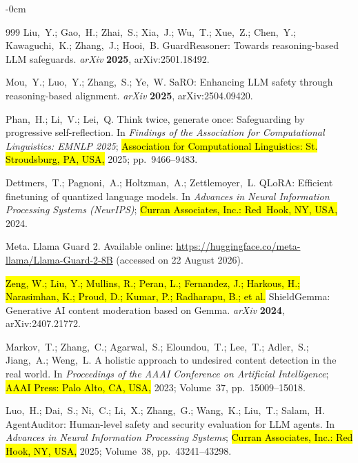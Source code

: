 \documentclass[superintelligence,article,accept,moreauthors]{Definitions/mdpi}
\begin{document}
\begin{adjustwidth}{-\extralength}{0cm}
{\begin{thebibliography}{999}
Liu,~Y.; Gao,~H.; Zhai,~S.; Xia,~J.; Wu,~T.; Xue,~Z.; Chen,~Y.; Kawaguchi,~K.; Zhang,~J.; Hooi,~B.
{GuardReasoner}: Towards reasoning-based {LLM} safeguards.
{\em arXiv} {\bf 2025}, arXiv:2501.18492.

Mou,~Y.; Luo,~Y.; Zhang,~S.; Ye,~W.
{SaRO}: Enhancing {LLM} safety through reasoning-based alignment.
{\em arXiv} {\bf 2025}, arXiv:2504.09420.

Phan,~H.; Li,~V.; Lei,~Q.
Think twice, generate once: Safeguarding by progressive self-reflection.
In {\em Findings of the Association for Computational Linguistics: EMNLP 2025}; \hl{Association for Computational Linguistics: St. Stroudsburg, PA, USA,} 2025; pp.~9466--9483.

Dettmers,~T.; Pagnoni,~A.; Holtzman,~A.; Zettlemoyer,~L.
{QLoRA}: Efficient finetuning of quantized language models.
In {\em Advances in Neural Information Processing Systems (NeurIPS)}; \hl{Curran Associates, Inc.: Red~Hook, NY, USA,} 2024.

Meta. {Llama Guard 2}. Available online: \url{https://huggingface.co/meta-llama/Llama-Guard-2-8B} (accessed on 22 August 2026).



\hl{Zeng, W.; Liu, Y.; Mullins, R.; Peran, L.; Fernandez, J.; Harkous, H.; Narasimhan, K.; Proud, D.; Kumar, P.; Radharapu, B.; et al.} %
{ShieldGemma}: Generative {AI} content moderation based on {Gemma}.
{\em arXiv} {\bf 2024}, arXiv:2407.21772.

Markov,~T.; Zhang,~C.; Agarwal,~S.; Eloundou,~T.; Lee,~T.; Adler,~S.; Jiang,~A.; Weng,~L.
A holistic approach to undesired content detection in the real world.
In {\em Proceedings of the AAAI Conference on Artificial Intelligence}; \hl{AAAI Press: Palo Alto, CA, USA,} 2023; Volume~37, pp.~15009--15018.


Luo,~H.; Dai,~S.; Ni,~C.; Li,~X.; Zhang,~G.; Wang,~K.; Liu,~T.; Salam,~H.
{AgentAuditor}: Human-level safety and security evaluation for {LLM} agents.
In {\em Advances in Neural Information Processing Systems}; \hl{Curran Associates, Inc.: Red Hook, NY, USA,} {2025}; Volume~38, pp.~43241--43298.


\end{thebibliography}}
\end{adjustwidth}
\end{document}
